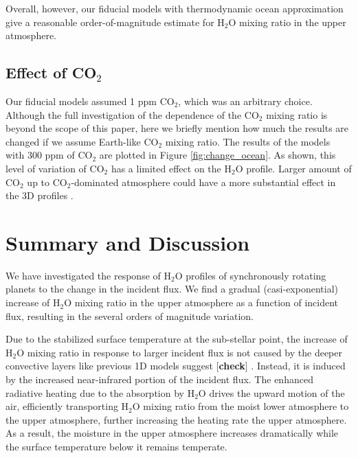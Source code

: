 \documentclass[11pt,numberedappendix,twocolappendix,]{emulateapj}
\def\water{H$_2$O }
\def\memo#1{\color{red}$[${\bf #1}$]$ \color{black}}
\begin{document}
Overall, however, our fiducial models with thermodynamic ocean approximation give a reasonable order-of-magnitude estimate for \water mixing ratio in the upper atmosphere. 

\subsection{Effect of CO$_2$}
\label{ss:sensitivity_ocean}

Our fiducial models assumed 1 ppm CO$_2$, which was an arbitrary choice. 
Although the full investigation of the dependence of the CO$_2$ mixing ratio is beyond the scope of this paper, here we briefly mention how much the results are changed if we assume Earth-like CO$_2$ mixing ratio. 
The results of the models with 300 ppm of CO$_2$ are plotted in Figure \ref{fig:change_ocean}. 
As shown, this level of variation of CO$_2$ has a limited effect on the \water profile. 
Larger amount of CO$_2$ up to CO$_2$-dominated atmosphere could have a more substantial effect in the 3D profiles \citep{Wordsworth2013}. 


\section{Summary and Discussion}
\label{s:summary}

We have investigated the response of \water profiles of synchronously rotating planets to the change in the incident flux. 
We find a gradual (casi-exponential) increase of \water mixing ratio in the upper atmosphere as a function of incident flux, resulting in the several orders of magnitude variation. 

Due to the stabilized surface temperature at the sub-stellar point, the increase of \water mixing ratio in response to larger incident flux is not caused by the deeper convective layers like previous 1D models suggest \memo{check}. 
Instead, it is induced by the increased near-infrared portion of the incident flux. 
The enhanced radiative heating due to the absorption by \water drives the upward motion of the air, efficiently transporting \water mixing ratio from the moist lower atmosphere to the upper atmosphere, further increasing the heating rate the upper atmosphere.
As a result, the moisture in the upper atmosphere increases dramatically while the surface temperature below it remains temperate. 
\end{document}
